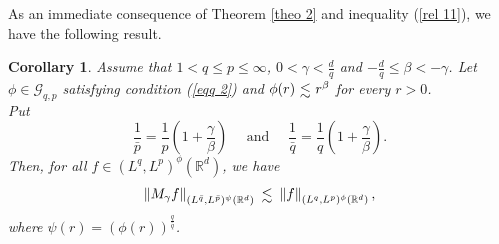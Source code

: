 \documentclass[a4paper,12pt,intlimits,oneside]{amsart}
\numberwithin{equation}{section}
\newtheorem{corollary}[theorem]{Corollary}
\numberwithin{equation}{section}
\def\lsim{\raisebox{-1ex}{$~\stackrel{\textstyle <}{\sim}~$}}
\theoremstyle{definition}
\begin{document}
As an immediate consequence of Theorem \ref{theo 2} and inequality (\ref{rel 11}), we have the
following result.
\begin{corollary}
Assume that $1 < q\leq p \leq \infty$, $ 0 < \gamma < \frac{d}{q}$ and $-\frac{d}{q} \leq \beta  < -\gamma $. Let $\phi\in \mathcal{G}_{q,p}$ satisfying condition (\ref{eqq 2}) and $\phi(r) \lsim  r^{\beta}$ for every $r > 0$. \\ Put $$\frac{1}{\bar{p}} = \frac{1}{p}\left(1 +\frac{\gamma}{\beta}\right) \quad \text{ and } \quad \frac{1}{\bar{q}} = \frac{1}{q}\left(1 +\frac{\gamma}{\beta}\right). $$
 Then, for all  $f \in (L^{q},L^{p})^{\phi}(\mathbb{R}^{d})$, we have
 $$\left\Vert M_{\gamma}f \right\Vert_{(L^{\bar{q}},L^{\bar{p}})^{\psi}(\mathbb{R}^{d})} \lsim  \left\Vert f  \right\Vert_{(L^{q},L^{p})^{\phi}(\mathbb{R}^{d})},$$ where  $\psi(r)= (\phi(r))^{\frac{q}{\bar{q}}}$.
\end{corollary}
\end{document}
